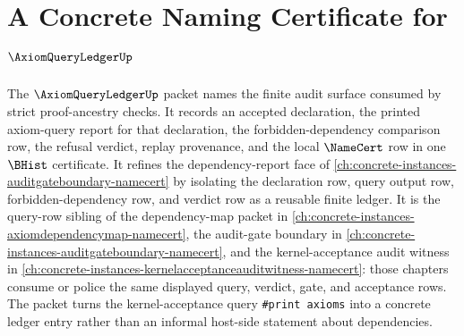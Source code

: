 \chapter{A Concrete Naming Certificate for $\AxiomQueryLedgerUp$}
\label{ch:concrete-instances-axiomqueryledger-namecert}

The $\AxiomQueryLedgerUp$ packet names the finite audit surface consumed by strict proof-ancestry checks. It records an accepted declaration, the printed axiom-query report for that declaration, the forbidden-dependency comparison row, the refusal verdict, replay provenance, and the local $\NameCert$ row in one $\BHist$ certificate. It refines the dependency-report face of \autoref{ch:concrete-instances-auditgateboundary-namecert} by isolating the declaration row, query output row, forbidden-dependency row, and verdict row as a reusable finite ledger. It is the query-row sibling of the dependency-map packet in \autoref{ch:concrete-instances-axiomdependencymap-namecert}, the audit-gate boundary in \autoref{ch:concrete-instances-auditgateboundary-namecert}, and the kernel-acceptance audit witness in \autoref{ch:concrete-instances-kernelacceptanceauditwitness-namecert}: those chapters consume or police the same displayed query, verdict, gate, and acceptance rows. The packet turns the kernel-acceptance query \texttt{\#print axioms} into a concrete ledger entry rather than an informal host-side statement about dependencies.

